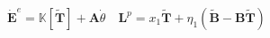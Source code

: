 \documentclass[preview]{standalone}
\begin{document}
\begin{align*}
\dot{\mathbf{E}}^e = \mathbb{K}[\tilde{\mathbf{T}}] + \mathbf{A} \dot{\theta} \quad \mathbf{L}^p = x_1 \tilde{\mathbf{T}} + \eta_1 (\tilde{\mathbf{B}} - \mathbf{B} \tilde{\mathbf{T}})
\end{align*}
\end{document}
